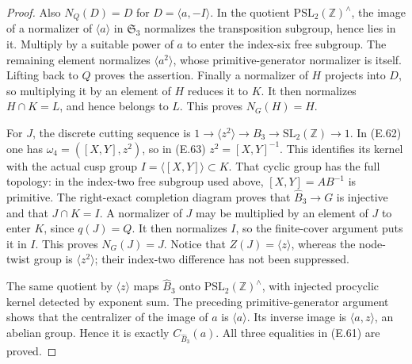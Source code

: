 \begin{proof}
Also $N_Q(D)=D$ for $D=\langle a,-I\rangle$.
In the quotient $\mathrm{PSL}_2(\mathbb Z)^{\wedge}$,
the image of a normalizer of $\langle a\rangle$
in $\mathfrak S_3$ normalizes the transposition
subgroup, hence lies in it.  Multiply by a
suitable power of $a$ to enter the index-six
free subgroup.  The remaining element normalizes
$\langle a^2\rangle$, whose primitive-generator
normalizer is itself.  Lifting back to $Q$
proves the assertion.  Finally a normalizer of
$H$ projects into $D$, so multiplying it by an
element of $H$ reduces it to $K$.  It then
normalizes $H\cap K=L$, and hence belongs to
$L$.  This proves $N_G(H)=H$.

For $J$, the discrete cutting sequence is
$1\to\langle z^2\rangle\to B_3\to
\mathrm{SL}_2(\mathbb Z)\to1$.
In (E.62) one has
$\omega _4=([X,Y],z^2)$, so in (E.63)
$z^2=[X,Y]^{-1}$.  This identifies its kernel
with the actual cusp group
$I=\langle[X,Y]\rangle\subset K$.
That cyclic group has the full topology: in the
index-two free subgroup used above,
$[X,Y]=AB^{-1}$ is primitive.  The right-exact
completion diagram proves that
$\widehat B_3\to G$ is injective and that
$J\cap K=I$.  A normalizer of $J$ may be
multiplied by an element of $J$ to enter $K$,
since $q(J)=Q$.  It then normalizes $I$, so
the finite-cover argument puts it in $I$.
This proves $N_G(J)=J$.
Notice that $Z(J)=\langle z\rangle$, whereas
the node-twist group is $\langle z^2\rangle$;
their index-two difference has not been suppressed.

The same quotient by $\langle z\rangle$ maps
$\widehat B_3$ onto
$\mathrm{PSL}_2(\mathbb Z)^{\wedge}$, with
injected procyclic kernel detected by exponent
sum.  The preceding primitive-generator argument
shows that the centralizer of the image of $a$
is $\langle a\rangle$.  Its inverse image is
$\langle a,z\rangle$, an abelian group.  Hence
it is exactly $C_{\widehat B_3}(a)$.
All three equalities in (E.61) are proved.
\end{proof}

